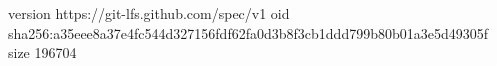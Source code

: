 version https://git-lfs.github.com/spec/v1
oid sha256:a35eee8a37e4fc544d327156fdf62fa0d3b8f3cb1ddd799b80b01a3e5d49305f
size 196704
